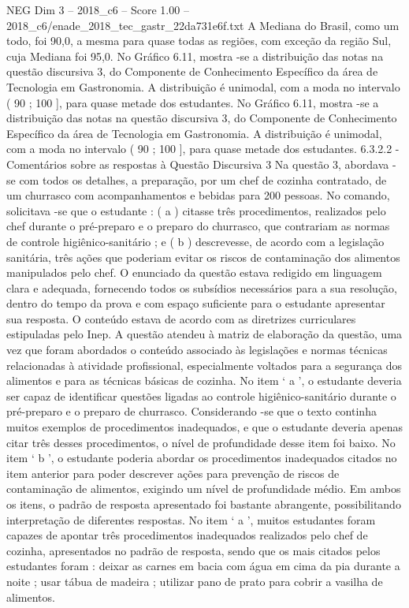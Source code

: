 \begin{textsample}{NEG Dim 3 – 2018\_c6 – Score 1.00 – 2018\_c6/enade\_2018\_tec\_gastr\_22da731e6f.txt}
A Mediana do Brasil, como um todo, foi 90,0, a mesma para quase todas as regiões, com exceção da região Sul, cuja Mediana foi 95,0.
No Gráfico 6.11, mostra -se a distribuição das notas na questão discursiva 3, do Componente de Conhecimento Específico da área de Tecnologia em Gastronomia.
A distribuição é unimodal, com a moda no intervalo ( 90 ; 100 ], para quase metade dos estudantes.
No Gráfico 6.11, mostra -se a distribuição das notas na questão discursiva 3, do Componente de Conhecimento Específico da área de Tecnologia em Gastronomia.
A distribuição é unimodal, com a moda no intervalo ( 90 ; 100 ], para quase metade dos estudantes. 6.3.2.2 - Comentários sobre as respostas à Questão Discursiva 3 Na questão 3, abordava -se com todos os detalhes, a preparação, por um chef de cozinha contratado, de um churrasco com acompanhamentos e bebidas para 200 pessoas.
No comando, solicitava -se que o estudante : ( a ) citasse três procedimentos, realizados pelo chef durante o pré-preparo e o preparo do churrasco, que contrariam as normas de controle higiênico-sanitário ; e ( b ) descrevesse, de acordo com a legislação sanitária, três ações que poderiam evitar os riscos de contaminação dos alimentos manipulados pelo chef.
O enunciado da questão estava redigido em linguagem clara e adequada, fornecendo todos os subsídios necessários para a sua resolução, dentro do tempo da prova e com espaço suficiente para o estudante apresentar sua resposta.
O conteúdo estava de acordo com as diretrizes curriculares estipuladas pelo Inep.
A questão atendeu à matriz de elaboração da questão, uma vez que foram abordados o conteúdo associado às legislações e normas técnicas relacionadas à atividade profissional, especialmente voltados para a segurança dos alimentos e para as técnicas básicas de cozinha.
No item ‘ a ’, o estudante deveria ser capaz de identificar questões ligadas ao controle higiênico-sanitário durante o pré-preparo e o preparo de churrasco.
Considerando -se que o texto continha muitos exemplos de procedimentos inadequados, e que o estudante deveria apenas citar três desses procedimentos, o nível de profundidade desse item foi baixo.
No item ‘ b ’, o estudante poderia abordar os procedimentos inadequados citados no item anterior para poder descrever ações para prevenção de riscos de contaminação de alimentos, exigindo um nível de profundidade médio.
Em ambos os itens, o padrão de resposta apresentado foi bastante abrangente, possibilitando interpretação de diferentes respostas.
No item ‘ a ’, muitos estudantes foram capazes de apontar três procedimentos inadequados realizados pelo chef de cozinha, apresentados no padrão de resposta, sendo que os mais citados pelos estudantes foram : deixar as carnes em bacia com água em cima da pia durante a noite ; usar tábua de madeira ; utilizar pano de prato para cobrir a vasilha de alimentos.

\end{textsample}
